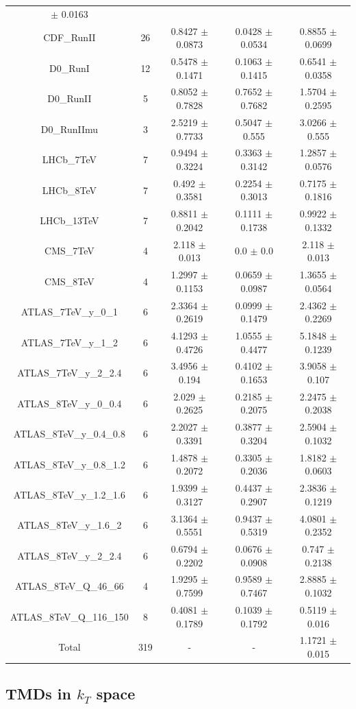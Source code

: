 \documentclass[
]{article}
\begin{document}
\begin{longtable}[]{@{}ccccc@{}}
\(\pm\) 0.0163\tabularnewline
CDF\_RunII & 26 & 0.8427 \(\pm\) 0.0873 & 0.0428 \(\pm\) 0.0534 & 0.8855
\(\pm\) 0.0699\tabularnewline
D0\_RunI & 12 & 0.5478 \(\pm\) 0.1471 & 0.1063 \(\pm\) 0.1415 & 0.6541
\(\pm\) 0.0358\tabularnewline
D0\_RunII & 5 & 0.8052 \(\pm\) 0.7828 & 0.7652 \(\pm\) 0.7682 & 1.5704
\(\pm\) 0.2595\tabularnewline
D0\_RunIImu & 3 & 2.5219 \(\pm\) 0.7733 & 0.5047 \(\pm\) 0.555 & 3.0266
\(\pm\) 0.555\tabularnewline
LHCb\_7TeV & 7 & 0.9494 \(\pm\) 0.3224 & 0.3363 \(\pm\) 0.3142 & 1.2857
\(\pm\) 0.0576\tabularnewline
LHCb\_8TeV & 7 & 0.492 \(\pm\) 0.3581 & 0.2254 \(\pm\) 0.3013 & 0.7175
\(\pm\) 0.1816\tabularnewline
LHCb\_13TeV & 7 & 0.8811 \(\pm\) 0.2042 & 0.1111 \(\pm\) 0.1738 & 0.9922
\(\pm\) 0.1332\tabularnewline
CMS\_7TeV & 4 & 2.118 \(\pm\) 0.013 & 0.0 \(\pm\) 0.0 & 2.118 \(\pm\)
0.013\tabularnewline
CMS\_8TeV & 4 & 1.2997 \(\pm\) 0.1153 & 0.0659 \(\pm\) 0.0987 & 1.3655
\(\pm\) 0.0564\tabularnewline
ATLAS\_7TeV\_y\_0\_1 & 6 & 2.3364 \(\pm\) 0.2619 & 0.0999 \(\pm\) 0.1479
& 2.4362 \(\pm\) 0.2269\tabularnewline
ATLAS\_7TeV\_y\_1\_2 & 6 & 4.1293 \(\pm\) 0.4726 & 1.0555 \(\pm\) 0.4477
& 5.1848 \(\pm\) 0.1239\tabularnewline
ATLAS\_7TeV\_y\_2\_2.4 & 6 & 3.4956 \(\pm\) 0.194 & 0.4102 \(\pm\)
0.1653 & 3.9058 \(\pm\) 0.107\tabularnewline
ATLAS\_8TeV\_y\_0\_0.4 & 6 & 2.029 \(\pm\) 0.2625 & 0.2185 \(\pm\)
0.2075 & 2.2475 \(\pm\) 0.2038\tabularnewline
ATLAS\_8TeV\_y\_0.4\_0.8 & 6 & 2.2027 \(\pm\) 0.3391 & 0.3877 \(\pm\)
0.3204 & 2.5904 \(\pm\) 0.1032\tabularnewline
ATLAS\_8TeV\_y\_0.8\_1.2 & 6 & 1.4878 \(\pm\) 0.2072 & 0.3305 \(\pm\)
0.2036 & 1.8182 \(\pm\) 0.0603\tabularnewline
ATLAS\_8TeV\_y\_1.2\_1.6 & 6 & 1.9399 \(\pm\) 0.3127 & 0.4437 \(\pm\)
0.2907 & 2.3836 \(\pm\) 0.1219\tabularnewline
ATLAS\_8TeV\_y\_1.6\_2 & 6 & 3.1364 \(\pm\) 0.5551 & 0.9437 \(\pm\)
0.5319 & 4.0801 \(\pm\) 0.2352\tabularnewline
ATLAS\_8TeV\_y\_2\_2.4 & 6 & 0.6794 \(\pm\) 0.2202 & 0.0676 \(\pm\)
0.0908 & 0.747 \(\pm\) 0.2138\tabularnewline
ATLAS\_8TeV\_Q\_46\_66 & 4 & 1.9295 \(\pm\) 0.7599 & 0.9589 \(\pm\)
0.7467 & 2.8885 \(\pm\) 0.1032\tabularnewline
ATLAS\_8TeV\_Q\_116\_150 & 8 & 0.4081 \(\pm\) 0.1789 & 0.1039 \(\pm\)
0.1792 & 0.5119 \(\pm\) 0.016\tabularnewline
Total & 319 & - & - & 1.1721 \(\pm\) 0.015\tabularnewline
\bottomrule
\end{longtable}

\hypertarget{tmds-in-k_t-space}{%
\subsection{\texorpdfstring{TMDs in \(k_T\)
space}{TMDs in k\_T space}}\label{tmds-in-k_t-space}}
\end{document}
